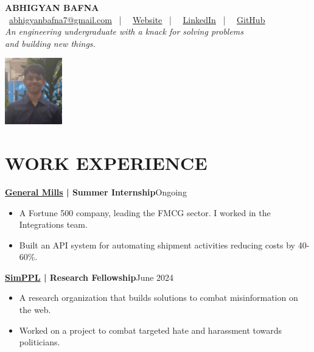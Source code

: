 \documentclass[a4paper,11pt]{article}
\newcommand{\entry}[2]{
  \noindent\textbf{#1}\hfill{#2}\\[-1em]
}
\newcommand{\contactlink}[2]{
    \href{#1}{\color{cyan}\underline{#2}}
}
\newenvironment{itemizeWithPadding}{
  \begin{itemize}
}{
  \end{itemize}
  \vspace{0.5em} %
}
\begin{document}
\begin{minipage}{0.87\textwidth}
{\headingfont\textbf{\huge ABHIGYAN BAFNA}}\\[0.5em]
\faEnvelope\,\contactlink{mailto:abhigyanbafna7@gmail.com}{abhigyanbafna7@gmail.com} \ | \
\faGlobe\,\contactlink{https://abhigyan.tech}{Website} \ | \
\faLinkedinSquare\,\contactlink{https://www.linkedin.com/in/AbhigyanBafna}{LinkedIn} \ | \
\faGithub\,\contactlink{https://github.com/AbhigyanBafna}{GitHub}\\[0.5em]
\textit{An engineering undergraduate with a knack for solving problems\\and building new things.}
\end{minipage}
\hfill
\begin{minipage}{0.13\textwidth}
\includegraphics[width=2.5cm]{profilePicture.jpg}
\end{minipage}

\section*{WORK EXPERIENCE}

\entry{\contactlink{https://www.generalmills.co.in/}{General Mills} | Summer Internship}{Ongoing}
\begin{itemizeWithPadding}
  \item A Fortune 500 company, leading the FMCG sector. I worked in the Integrations team.
  \item Built an API system for automating shipment activities reducing costs by 40-60\%.
\end{itemizeWithPadding}

\entry{\contactlink{https://simppl.org/}{SimPPL} | Research Fellowship}{June 2024}
\begin{itemizeWithPadding}
  \item A research organization that builds solutions to combat misinformation on the web.
  \item Worked on a project to combat targeted hate and harassment towards politicians.
\end{itemizeWithPadding}
\end{document}
